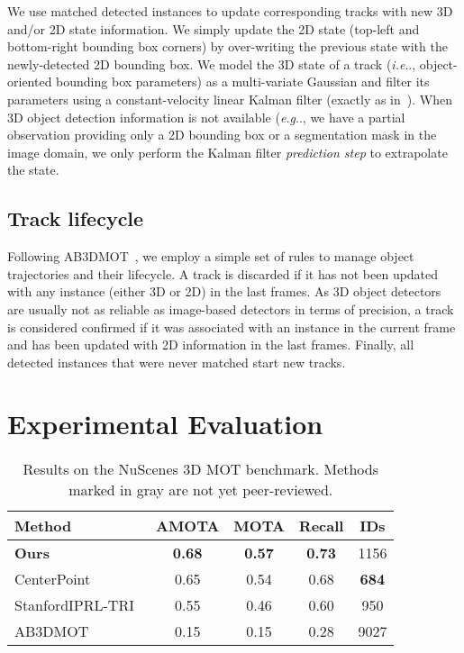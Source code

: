\documentclass[letterpaper, 10 pt, conference]{ieeeconf}
\makeatletter
\DeclareRobustCommand\onedot{\futurelet\@let@token\@onedot}
\def\@onedot{\ifx\@let@token.\else.\null\fi\xspace}
\def\eg{\emph{e.g}\onedot} \def\Eg{\emph{E.g}\onedot}
\def\ie{\emph{i.e}\onedot} \def\Ie{\emph{I.e}\onedot}
\newcommand{\PAR}[1]{\vskip4pt \noindent {\bf #1~}}
\newcommand{\UNPUB}[1]{\textcolor{ubpubColor}{#1}}
\makeatother
\begin{document}
\PAR{State update.} 
We use matched detected instances to update corresponding tracks with new 3D and/or 2D state information. We simply update the 2D state (top-left and bottom-right bounding box corners) by over-writing the previous state with the newly-detected 2D bounding box. 
We model the 3D state of a track (\ie, object-oriented bounding box parameters) as a multi-variate Gaussian and filter its parameters using a constant-velocity linear Kalman filter (exactly as in~\cite{Weng2020_AB3DMOT}). 
When 3D object detection information is not available (\eg, we have a partial observation providing only a 2D bounding box or a  segmentation mask in the image domain, we only perform the Kalman filter \textit{prediction step} to extrapolate the state. 



\subsection{Track lifecycle}

Following AB3DMOT~\cite{Weng2020_AB3DMOT}, we employ a simple set of rules to manage object trajectories and their lifecycle. 
A track is discarded if it has not been updated with any instance (either 3D or 2D) in the last  frames. 
As 3D object detectors are usually not as reliable as image-based detectors in terms of precision, a track is considered confirmed if it was associated with an instance in the current frame and has been updated with 2D information in the last  frames. 
Finally, all detected instances  that were never matched start new tracks. 




\section{Experimental Evaluation}  

\begin{table}
\begin{center}
\vspace{+8pt}


\begin{tabular}{l|c|c|c|c}




\toprule
Method & AMOTA & MOTA & Recall & IDs \\
\hline\hline
\textbf{Ours} & \textbf{0.68} & \textbf{0.57} & \textbf{0.73} & 1156 \\
\UNPUB{CenterPoint}~\cite{yin2020center} & 0.65 & 0.54 & 0.68 & \textbf{684} \\
\UNPUB{StanfordIPRL-TRI}~\cite{chiu2020probabilistic} & 0.55 & 0.46 & 0.60 & 950 \\
AB3DMOT~\cite{Weng2020_AB3DMOT} & 0.15 & 0.15 & 0.28 & 9027 \\


\bottomrule
\end{tabular}
\end{center}
\vspace{-7pt}
\caption{Results on the NuScenes 3D MOT benchmark. Methods marked in gray are not yet peer-reviewed.}
\label{tab:nuscenes_test}
\end{table}
 
\end{document}
